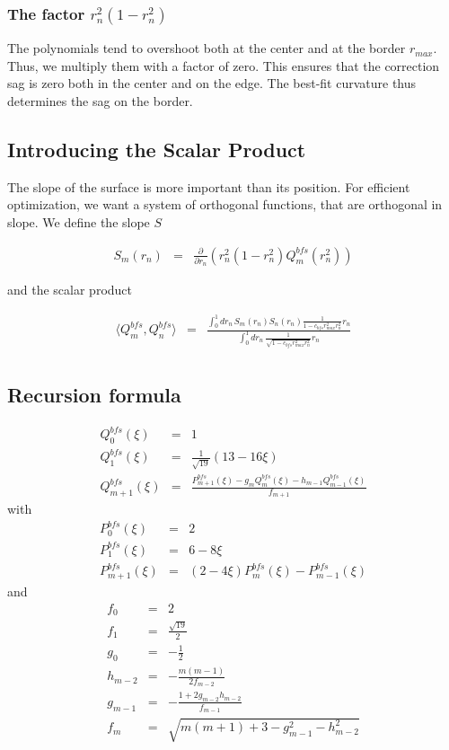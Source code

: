 \documentclass[10pt]{revtex4-1}
\newcommand\rmax{r_{max}}
\newcommand\rnorm{r_{n}}
\begin{document}
\subsubsection{The factor $\rnorm^2 (1-\rnorm^2)$}
The polynomials tend to overshoot both at the center and at the border $\rmax$. Thus, we multiply them with a factor of zero. This ensures that the correction sag is zero both in the center and on the edge. The best-fit curvature thus determines the sag on the border.


\subsection{Introducing the Scalar Product}

The slope of the surface is more important than its position. For efficient optimization, we want a system of orthogonal functions, that are orthogonal in slope. We define the slope $S$

\begin{eqnarray}
  S_m(\rnorm) &=& \frac{\partial}{\partial \rnorm} 
	  \left(
		  \rnorm^2 (1-\rnorm^2) Q_m^{bfs}(\rnorm^2)
		\right)
\end{eqnarray}

and the scalar product

\begin{eqnarray}
  \langle Q_m^{bfs}, Q_n^{bfs} \rangle 
	&=&
	\frac{ \int_{0}^{1} d\rnorm \, S_m(\rnorm) S_n(\rnorm) \frac{1}{1 - c_{bfs} \rmax^2 \rnorm^2}  \rnorm}{ \int_{0}^{1} d\rnorm \, \frac{1}{\sqrt{1 - c_{bfs} \rmax^2 \rnorm^2}} \rnorm} \\
\end{eqnarray}

\subsection{Recursion formula}
\begin{eqnarray}
Q_0^{bfs}(\xi) &=& 1 \\
Q_1^{bfs}(\xi) &=& \frac{1}{\sqrt{19}} (13 - 16\xi) \\
Q_{m+1}^{bfs}(\xi) &=& 
  \frac{
    P^{bfs}_{m+1}(\xi) - g_m Q_{m}^{bfs}(\xi) - h_{m-1} Q_{m-1}^{bfs}(\xi) 
	}{
    f_{m+1}
	}
\end{eqnarray}
with
\begin{eqnarray}
P_0^{bfs}(\xi) &=& 2 \\
P_1^{bfs}(\xi) &=& 6 - 8\xi \\
P_{m+1}^{bfs}(\xi) &=& 
  (2-4\xi) P_{m}^{bfs}(\xi)
	-
	P_{m-1}^{bfs}(\xi)
\end{eqnarray}
and
\begin{eqnarray}
  f_0 &=& 2 \\
	f_1 &=& \frac{\sqrt{19}}{2} \\
	g_0 &=& -\frac{1}{2} \\
	h_{m-2} &=& - \frac{ m (m-1) }{2 f_{m-2}} \\
	g_{m-1} &=& - \frac{1+2g_{m-2}h_{m-2}}{f_{m-1}} \\
	f_m &=& \sqrt{ m(m+1) + 3 - g_{m-1}^2 - h_{m-2}^2 }
\end{eqnarray}
\end{document}
